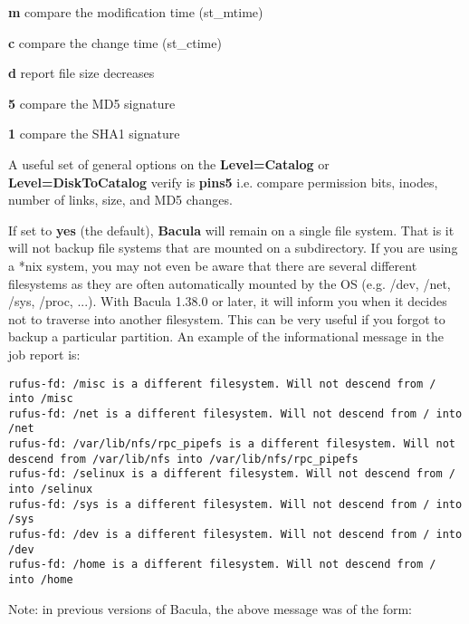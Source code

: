 \begin{description}
\begin{description}
      \item {\bf m}
      compare the modification time (st\_mtime)  

      \item {\bf c}
      compare the change time (st\_ctime)  

      \item {\bf d}
      report file size decreases  

      \item {\bf 5}
      compare the MD5 signature  

      \item {\bf 1}
      compare the SHA1 signature  
      \end{description}

   A useful set of general options on the {\bf Level=Catalog}  or {\bf
   Level=DiskToCatalog}  verify is {\bf pins5} i.e. compare permission bits,
   inodes, number  of links, size, and MD5 changes. 

\item [onefs=yes\vb{}no]
   If set to {\bf yes} (the default), {\bf Bacula} will remain on a single
   file system.  That is it will not backup file systems that are mounted
   on a subdirectory.  If you are using a *nix system, you may not even be
   aware that there are several different filesystems as they are often
   automatically mounted by the OS (e.g.  /dev, /net, /sys, /proc, ...).
   With Bacula 1.38.0 or later, it will inform you when it decides not to
   traverse into another filesystem.  This can be very useful if you forgot
   to backup a particular partition.  An example of the informational
   message in the job report is:

\footnotesize
\begin{verbatim}
rufus-fd: /misc is a different filesystem. Will not descend from / into /misc
rufus-fd: /net is a different filesystem. Will not descend from / into /net
rufus-fd: /var/lib/nfs/rpc_pipefs is a different filesystem. Will not descend from /var/lib/nfs into /var/lib/nfs/rpc_pipefs
rufus-fd: /selinux is a different filesystem. Will not descend from / into /selinux
rufus-fd: /sys is a different filesystem. Will not descend from / into /sys
rufus-fd: /dev is a different filesystem. Will not descend from / into /dev
rufus-fd: /home is a different filesystem. Will not descend from / into /home
\end{verbatim}
\normalsize

   Note: in previous versions of Bacula, the above message was of the form: 


\end{description}
